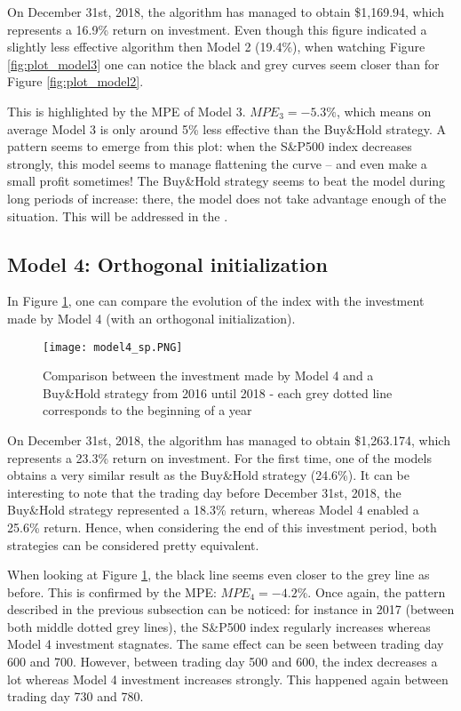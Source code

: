 \documentclass[11pt]{article}
\begin{document}
\begin{onehalfspace}
On December 31st, 2018, the algorithm has managed to obtain \$1,169.94, which represents a 16.9\% return on investment. Even though this figure indicated a slightly less effective algorithm then Model 2 (19.4\%), when watching Figure \ref{fig:plot_model3} one can notice the black and grey curves seem closer than for Figure \ref{fig:plot_model2}.

This is highlighted by the MPE of Model 3. $MPE_3 = -5.3\%$, which means on average Model 3 is only around 5\% less effective than the Buy\&Hold strategy. A pattern seems to emerge from this plot: when the S\&P500 index decreases strongly, this model seems to manage flattening the curve -- and even make a small profit sometimes! The Buy\&Hold strategy seems to beat the model during long periods of increase: there, the model does not take advantage enough of the situation. This will be addressed in the .

\subsection{Model 4: Orthogonal initialization}


In Figure \ref{fig:plot_model4}, one can compare the evolution of the index with the investment made by Model 4 (with an orthogonal initialization).

\begin{figure}[h!]
    \centering
    \texttt{[image: model4\_sp.PNG]}
    \caption{Comparison between the investment made by Model 4 and a Buy\&Hold strategy from 2016 until 2018 - each grey dotted line corresponds to the beginning of a year}
\label{fig:plot_model4}
\end{figure}

On December 31st, 2018, the algorithm has managed to obtain \$1,263.174, which represents a 23.3\% return on investment. For the first time, one of the models obtains a very similar result as the Buy\&Hold strategy (24.6\%). It can be interesting to note that the trading day before December 31st, 2018, the Buy\&Hold strategy represented a 18.3\% return, whereas Model 4 enabled a 25.6\% return. Hence, when considering the end of this investment period, both strategies can be considered pretty equivalent.

When looking at Figure \ref{fig:plot_model4}, the black line seems even closer to the grey line as before. This is confirmed by the MPE: $MPE_4 = -4.2\%$. Once again, the pattern described in the previous subsection can be noticed: for instance in 2017 (between both middle dotted grey lines), the S\&P500 index regularly increases whereas Model 4 investment stagnates. The same effect can be seen between trading day 600 and 700. However, between trading day 500 and 600, the index decreases a lot whereas Model 4 investment increases strongly. This happened again between trading day 730 and 780. 


\end{onehalfspace}
\end{document}
